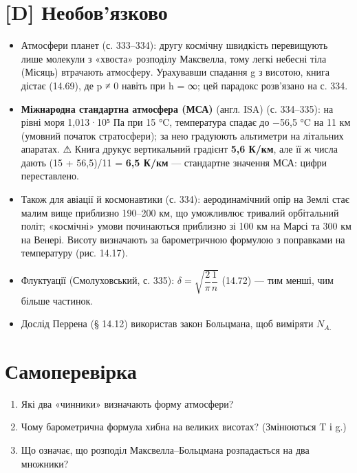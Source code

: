 \documentclass[11pt,a4paper,oneside]{book}
\newcommand{\warn}{{\sffamily\color{warncol}⚠}}
\begin{document}
\section*{[D] Необов'язково}
\begin{itemize}
\item Атмосфери планет (с. 333–334): другу космічну швидкість перевищують лише молекули з «хвоста» розподілу Максвелла, тому легкі небесні тіла (Місяць) втрачають атмосферу. Урахувавши спадання g з висотою, книга дістає (14.69), де p ≠ 0 навіть при h = ∞; цей парадокс розв'язано на с. 334.
\item \textbf{Міжнародна стандартна атмосфера (МСА)} (англ. ISA) (с. 334–335): на рівні моря 1,013·10⁵ Па при 15 °C, температура спадає до −56,5 °C на 11 км (умовний початок стратосфери); за нею градуюють альтиметри на літальних апаратах. \warn{} Книга друкує вертикальний градієнт \textbf{5,6 К/км}, але її ж числа дають (15 + 56,5)/11 = \textbf{6,5 К/км} — стандартне значення МСА: цифри переставлено.
\item Також для авіації й космонавтики (с. 334): аеродинамічний опір на Землі стає малим вище приблизно 190–200 км, що уможливлює тривалий орбітальний політ; «космічні» умови починаються приблизно зі 100 км на Марсі та 300 км на Венері. Висоту визначають за барометричною формулою з поправками на температуру (рис. 14.17).
\item Флуктуації (Смолуховський, с. 335): $\delta = \sqrt{\dfrac2\pi\dfrac1n}$ (14.72) — тим менші, чим більше частинок.
\item Дослід Перрена (§ 14.12) використав закон Больцмана, щоб виміряти $N_{A.}$
\end{itemize}

\section*{Самоперевірка}
\begin{enumerate}
\item Які два «чинники» визначають форму атмосфери?
\item Чому барометрична формула хибна на великих висотах? (Змінюються T і g.)
\item Що означає, що розподіл Максвелла–Больцмана розпадається на два множники?
\end{enumerate}
\end{document}
